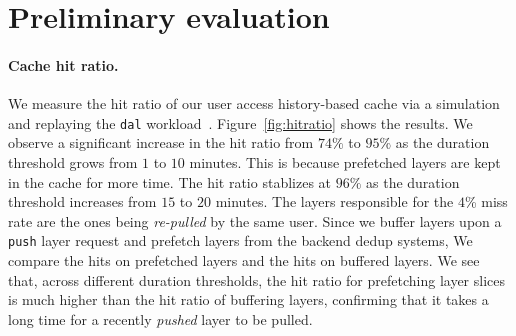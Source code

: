 \section{Preliminary evaluation}
\label{sec:Evaluation}



\vspace{-6pt}
\paragraph{Cache hit ratio.}

We measure the hit ratio of our user access history-based cache via
a simulation and 
replaying the \texttt{dal} workload~\cite{dockerworkload}.
Figure~\ref{fig:hitratio} shows the results. We observe a significant increase in the hit ratio from $74\%$ to $95\%$ as the duration threshold grows from $1$ to $10$ minutes. This is because prefetched layers are kept in the cache for more time.
The hit ratio stablizes at $96\%$ as the duration threshold increases from $15$ to $20$ minutes.
The layers responsible for the $4$\% miss rate are the ones being
\emph{re-pulled} by the same user.
Since we buffer layers upon a \texttt{push} layer request and prefetch layers from the backend dedup systems, 
We compare the hits on prefetched layers and the hits on buffered layers.
We see that, across different duration thresholds, 
the hit ratio for prefetching layer slices is much higher than the hit ratio of buffering layers,
confirming that it takes a long time for a recently \emph{pushed} layer to be pulled.


